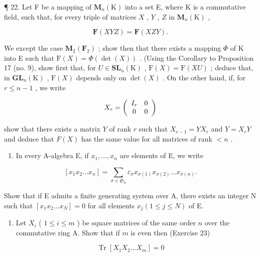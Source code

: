 ¶ 22. Let F be a mapping of \(\mathbf{M}_{n}(\mathrm{K})\) into a set E, where K is a commutative field, such that, for every triple of matrices \(X\) , \(Y\) , \(Z\) in \(\mathbf{M}_{n}(\mathrm{K})\) ,

\[
\mathbf {F} (X Y Z) = \mathbf {F} (X Z Y).
\]

We except the case \(\mathbf{M}_{2}(\mathbf{F}_{2})\) ; show then that there exists a mapping \(\Phi\) of K into E such that \(\mathrm{F}(X)=\Phi(\det(X))\) . (Using the Corollary to Proposition 17 (no. 9), show first that, for \(U\in\mathbf{SL}_{n}(\mathrm{K})\) , \(\mathrm{F}(X)=\mathrm{F}(XU)\) ; deduce that, in \(\mathbf{GL}_{n}(\mathrm{K})\) , \(\mathrm{F}(X)\) depends only on \(\det(X)\) . On the other hand, if, for \(r\leqslant n-1\) , we write

\[
X _ {r} = \left( \begin{array}{c c} I _ {r} & 0 \\ 0 & 0 \end{array} \right)
\]

show that there exists a matrix \(Y\) of rank \(r\) such that \(X_{r-1} = YX_r\) and \(Y = X_rY\) and deduce that \(F(X)\) has the same value for all matrices of rank \(< n\) .

\begin{enumerate}
\def\labelenumi{\arabic{enumi}.}
\setcounter{enumi}{22}
\tightlist
\item
  In every A-algebra E, if \(x_{1}, \ldots, x_{n}\) are elements of E, we write
\end{enumerate}

\[
\left[ x _ {1} x _ {2} \dots x _ {n} \right] = \sum_ {\sigma \in \mathfrak {S} _ {n}} \varepsilon_ {\sigma} x _ {\sigma (1)} x _ {\sigma (2)} \dots x _ {\sigma (n)}.
\]

Show that if E admits a finite generating system over A, there exists an integer N such that \([x_{1}x_{2}\ldots x_{N}] = 0\) for all elements \(x_{j} (1 \leqslant j \leqslant N)\) of E.

\begin{enumerate}
\def\labelenumi{\arabic{enumi}.}
\setcounter{enumi}{23}
\tightlist
\item
  Let \(X_{i}\) ( \(1 \leqslant i \leqslant m\) ) be square matrices of the same order \(n\) over the commutative ring A. Show that if \(m\) is even then (Exercise 23)
\end{enumerate}

\[
\operatorname{Tr} \left[ X _ {1} X _ {2} \dots X _ {m} \right] = 0
\]

